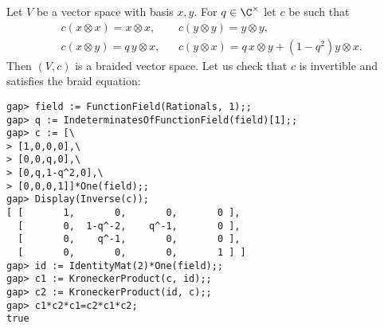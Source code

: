 \begin{example}
	Let $V$ be a vector space with basis $x,y$. For $q\in\C^{\times}$ let $c$ be such that 
	\begin{align*}
		&c(x\otimes x)=x\otimes x, && 
		c(y\otimes y)=y\otimes y, \\
		&c(x\otimes y)=q\, y\otimes x, && 
		c(y\otimes x)=q\, x\otimes y+(1-q^2)y\otimes x.
	\end{align*}
	Then $(V,c)$ is a braided vector space. Let us check that $c$ is invertible
	and satisfies the braid equation:
\begin{lstlisting}
gap> field := FunctionField(Rationals, 1);;
gap> q := IndeterminatesOfFunctionField(field)[1];;
gap> c := [\
> [1,0,0,0],\
> [0,0,q,0],\
> [0,q,1-q^2,0],\
> [0,0,0,1]]*One(field);;
gap> Display(Inverse(c));
[ [       1,       0,       0,       0 ],
  [       0,  1-q^-2,    q^-1,       0 ],
  [       0,    q^-1,       0,       0 ],
  [       0,       0,       0,       1 ] ]
gap> id := IdentityMat(2)*One(field);;
gap> c1 := KroneckerProduct(c, id);;
gap> c2 := KroneckerProduct(id, c);;
gap> c1*c2*c1=c2*c1*c2;
true
\end{lstlisting}
\end{example}

